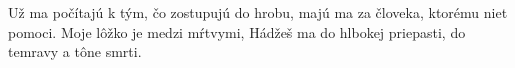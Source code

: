 Už ma počítajú k tým, čo zostupujú do hrobu,
\versseparator
majú ma za človeka, ktorému niet pomoci. Moje lôžko je medzi mŕtvymi,
\versseparator
Hádžeš ma do hlbokej priepasti, do temravy a tône smrti.